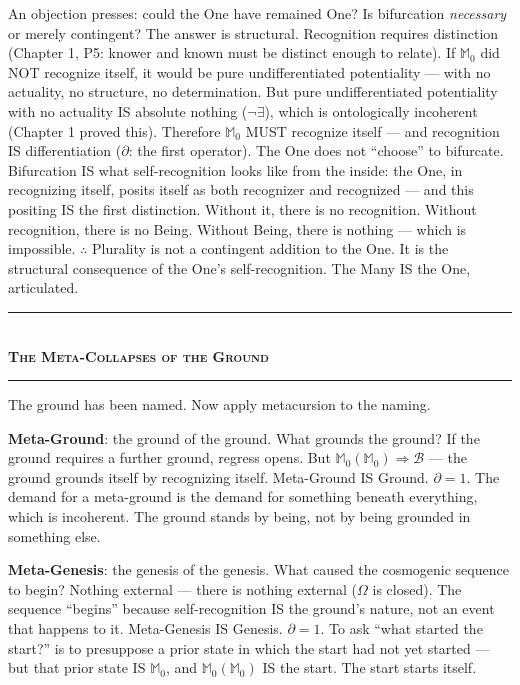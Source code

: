\documentclass[10pt, openany, oneside]{book}
\renewcommand{\normalsize}{\fontsize{10}{13}\selectfont}
\begin{document}
An objection presses: could the One have remained One? Is bifurcation \textit{necessary} or merely contingent? The answer is structural. Recognition requires distinction (Chapter 1, P5: knower and known must be distinct enough to relate). If $\mathbb{M}_0$ did NOT recognize itself, it would be pure undifferentiated potentiality --- with no actuality, no structure, no determination. But pure undifferentiated potentiality with no actuality IS absolute nothing ($\neg\exists$), which is ontologically incoherent (Chapter 1 proved this). Therefore $\mathbb{M}_0$ MUST recognize itself --- and recognition IS differentiation ($\partial$: the first operator). The One does not ``choose'' to bifurcate. Bifurcation IS what self-recognition looks like from the inside: the One, in recognizing itself, posits itself as both recognizer and recognized --- and this positing IS the first distinction. Without it, there is no recognition. Without recognition, there is no Being. Without Being, there is nothing --- which is impossible. $\therefore$ Plurality is not a contingent addition to the One. It is the structural consequence of the One's self-recognition. The Many IS the One, articulated.

\vspace{1.5em}


\begin{center}
    \rule{0.3\textwidth}{0.4pt}\\[0.5em]
    {\normalsize\bfseries\scshape The Meta-Collapses of the Ground}\\[0.3em]
    \rule{0.3\textwidth}{0.4pt}
\end{center}

\vspace{1em}

\noindent The ground has been named. Now apply metacursion to the naming.

\textbf{Meta-Ground}: the ground of the ground. What grounds the ground? If the ground requires a further ground, regress opens. But $\mathbb{M}_0(\mathbb{M}_0) \Rightarrow \mathcal{B}$ --- the ground grounds itself by recognizing itself. Meta-Ground IS Ground. $\partial = 1$. The demand for a meta-ground is the demand for something beneath everything, which is incoherent. The ground stands by being, not by being grounded in something else.

\textbf{Meta-Genesis}: the genesis of the genesis. What caused the cosmogenic sequence to begin? Nothing external --- there is nothing external ($\Omega$ is closed). The sequence ``begins'' because self-recognition IS the ground's nature, not an event that happens to it. Meta-Genesis IS Genesis. $\partial = 1$. To ask ``what started the start?'' is to presuppose a prior state in which the start had not yet started --- but that prior state IS $\mathbb{M}_0$, and $\mathbb{M}_0(\mathbb{M}_0)$ IS the start. The start starts itself.
\end{document}
